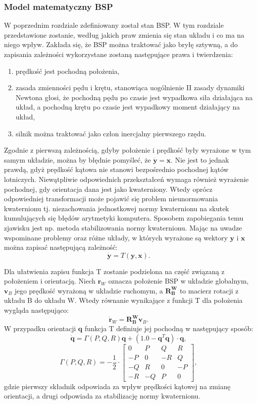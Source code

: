 \subsubsection{Model matematyczny BSP}

W poprzednim rozdziale zdefiniowany został stan BSP. W tym rozdziale przedstawione zostanie, według jakich praw zmienia się stan układu i co ma na niego wpływ. Zakłada się, że BSP można traktować jako bryłę sztywną, a do zapisania zależności wykorzystane zostaną następujące prawa i twierdzenia:

\begin{enumerate}
\item prędkość jest pochodną położenia,
\item zasada zmienności pędu i krętu, stanowiąca uogólnienie II zasady dynamiki Newtona głosi, że pochodną pędu po czasie jest wypadkowa siła działająca na układ, a pochodną krętu po czasie jest wypadkowy moment działający na układ,
\item silnik można traktować jako człon inercjalny pierwszego rzędu.
\end{enumerate}

Zgodnie z pierwszą zależnością, gdyby położenie i prędkość były wyrażone w tym samym układzie, można by błędnie pomyśleć, że $\bm{\dot{y}} = \bm{x}$. Nie jest to jednak prawdą, gdyż prędkość kątowa nie stanowi bezpośrednio pochodnej kątów lotniczych. Niewątpliwie odpowiednich przekształceń wymaga również wyrażenie pochodnej, gdy orientacja dana jest jako kwaterniony. Wtedy oprócz odpowiedniej transformacji może pojawić się problem nieunormowania kwaternionu tj. niezachowania jednostkowej normy kwaternionu na skutek kumulujących się błędów arytmetyki komputera. Sposobem zapobiegania temu zjawisku jest np. metoda stabilizowania normy kwaternionu. Mając na uwadze wspominane problemy oraz różne układy, w których wyrażone są wektory $\bm{y}$ i $\bm{x}$ można zapisać następującą zależność:
\[
	\bm{\dot{y}} = T(\bm{y}, \bm{x}).
\]

Dla ułatwienia zapisu funkcja T zostanie podzielona na część związaną z położeniem i orientacją. Niech $\bm{r}_W$ oznacza położenie BSP w układzie globalnym, $\bm{v}_B$ jego prędkość wyrażoną w układzie ruchomym, a $\bm{R_B^W}$ to macierz rotacji z układu B do układu W. Wtedy równanie wynikające z funkcji T dla położenia wygląda następująco:
\[
	\bm{\dot{r}}_W = \bm{R_B^W} \bm{v}_B.
\]
W przypadku orientacji $\bm{q}$ funkcja T definiuje jej pochodną w następujący sposób:
\[
	\bm{\dot{q}} = 	\Gamma(P,Q,R) \bm{q} +\left ( 1.0 - \bm{q}^T \bm{q} \right) \cdot \bm{q},
\]
\[
	\Gamma(P,Q,R) = - \frac{1}{2} \cdot \begin{bmatrix}
	0 & P & Q & R \\ -P & 0 & -R & Q \\ -Q & R & 0 & -P \\ -R & -Q & P & 0
	\end{bmatrix},
\]
gdzie pierwszy składnik odpowiada za wpływ prędkości kątowej na zmianę orientacji, a drugi odpowiada za stabilizację normy kwaternionu.\\

